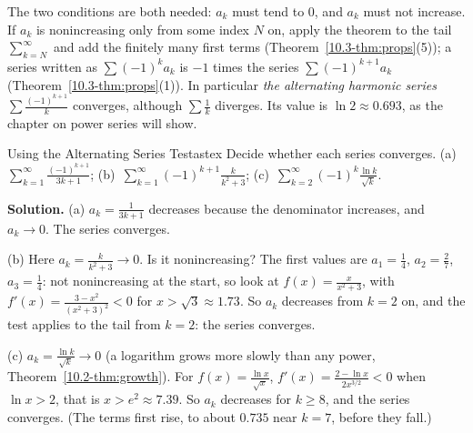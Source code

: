 \documentclass[11pt]{article}
\begin{document}
The two conditions are both needed: $a_k$ must tend to $0$, and $a_k$ must not increase. If $a_k$ is nonincreasing only from some index $N$ on, apply the theorem to the tail $\sum_{k=N}^\infty$ and add the finitely many first terms (Theorem~\ref{10.3-thm:props}(5)); a series written as $\sum(-1)^ka_k$ is $-1$ times the series $\sum(-1)^{k+1}a_k$ (Theorem~\ref{10.3-thm:props}(1)). In particular \emph{the alternating harmonic series} $\sum\frac{(-1)^{k+1}}k$ converges, although $\sum\frac1k$ diverges. Its value is $\ln2\approx0.693$, as the chapter on power series will show.

\begin{exmp}{Using the Alternating Series Test}{astex}
Decide whether each series converges. (a)~$\displaystyle\sum_{k=1}^\infty\frac{(-1)^{k+1}}{3k+1}$; \quad (b)~$\displaystyle\sum_{k=1}^\infty(-1)^{k+1}\frac k{k^2+3}$; \quad (c)~$\displaystyle\sum_{k=2}^\infty(-1)^k\frac{\ln k}{\sqrt k}$.

\textbf{Solution.} (a) $a_k=\frac1{3k+1}$ decreases because the denominator increases, and $a_k\to0$. The series converges.

(b) Here $a_k=\frac k{k^2+3}\to0$. Is it nonincreasing? The first values are $a_1=\frac14$, $a_2=\frac27$, $a_3=\frac14$: not nonincreasing at the start, so look at $f(x)=\frac x{x^2+3}$, with $f'(x)=\frac{3-x^2}{(x^2+3)^2}<0$ for $x>\sqrt3\approx1.73$. So $a_k$ decreases from $k=2$ on, and the test applies to the tail from $k=2$: the series converges.

(c) $a_k=\frac{\ln k}{\sqrt k}\to0$ (a logarithm grows more slowly than any power, Theorem~\ref{10.2-thm:growth}). For $f(x)=\frac{\ln x}{\sqrt x}$, $f'(x)=\frac{2-\ln x}{2x^{3/2}}<0$ when $\ln x>2$, that is $x>e^2\approx7.39$. So $a_k$ decreases for $k\ge8$, and the series converges. (The terms first rise, to about $0.735$ near $k=7$, before they fall.)
\end{exmp}
\end{document}
